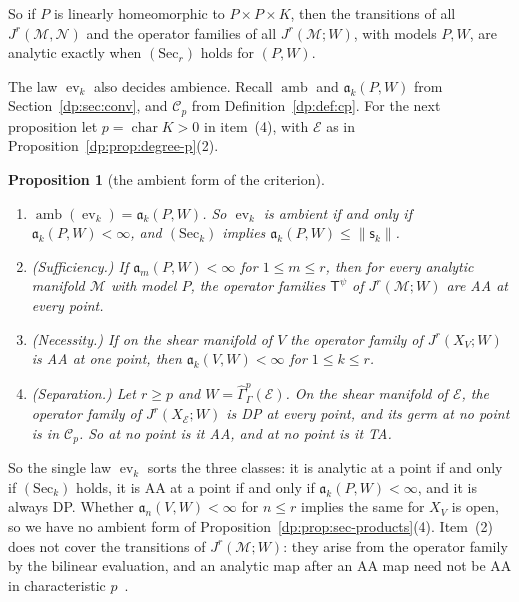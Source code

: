 \documentclass[11pt]{amsart}
\newtheorem{proposition}[theorem]{Proposition}
\theoremstyle{definition}
\theoremstyle{remark}
\numberwithin{equation}{section}
\newcommand{\norm}[1]{\lVert #1\rVert}
\newcommand{\cC}{\mathcal{C}}
\theoremstyle{plain}
\theoremstyle{definition}
\theoremstyle{plain}
\newcommand{\ev}{\operatorname{ev}}
\newcommand{\hGamma}{\widehat\Gamma}
\begin{document}
So if $P$ is linearly homeomorphic to $P\times P\times K$, then the transitions of all $J^r(\mathcal M,\mathcal N)$ and the operator families of all $J^r(\mathcal M;W)$, with models $P,W$, are analytic exactly when $(\mathrm{Sec}_r)$ holds for $(P,W)$.

The law $\ev_k$ also decides ambience. Recall $\operatorname{amb}$ and $\mathfrak a_k(P,W)$ from Section~\ref{dp:sec:conv}, and $\cC_p$ from Definition~\ref{dp:def:cp}. For the next proposition let $p=\operatorname{char}K>0$ in item~(4), with $\mathcal E$ as in Proposition~\ref{dp:prop:degree-p}(2).

\begin{proposition}[the ambient form of the criterion]\label{dp:prop:jets-not-ambient}
\leavevmode
\begin{enumerate}
\item $\operatorname{amb}(\ev_k)=\mathfrak a_k(P,W)$. So $\ev_k$ is ambient if and only if $\mathfrak a_k(P,W)<\infty$, and $(\mathrm{Sec}_k)$ implies $\mathfrak a_k(P,W)\le\norm{\mathsf s_k}$.
\item \textup{(Sufficiency.)} If $\mathfrak a_m(P,W)<\infty$ for $1\le m\le r$, then for every analytic manifold $\mathcal M$ with model $P$, the operator families $\mathsf T^\psi$ of $J^r(\mathcal M;W)$ are AA at every point.
\item \textup{(Necessity.)} If on the shear manifold of $V$ the operator family of $J^r(X_V;W)$ is AA at one point, then $\mathfrak a_k(V,W)<\infty$ for $1\le k\le r$.
\item \textup{(Separation.)} Let $r\ge p$ and $W=\hGamma^p_\Gamma(\mathcal E)$. On the shear manifold of $\mathcal E$, the operator family of $J^r(X_{\mathcal E};W)$ is DP at every point, and its germ at no point is in $\cC_p$. So at no point is it AA, and at no point is it TA.
\end{enumerate}
\end{proposition}

So the single law $\ev_k$ sorts the three classes: it is analytic at a point if and only if $(\mathrm{Sec}_k)$ holds, it is AA at a point if and only if $\mathfrak a_k(P,W)<\infty$, and it is always DP. Whether $\mathfrak a_n(V,W)<\infty$ for $n\le r$ implies the same for $X_V$ is open, so we have no ambient form of Proposition~\ref{dp:prop:sec-products}(4). Item~(2) does not cover the transitions of $J^r(\mathcal M;W)$: they arise from the operator family by the bilinear evaluation, and an analytic map after an AA map need not be AA in characteristic $p$~\cite[Theorem~14.17]{I}.
\end{document}
